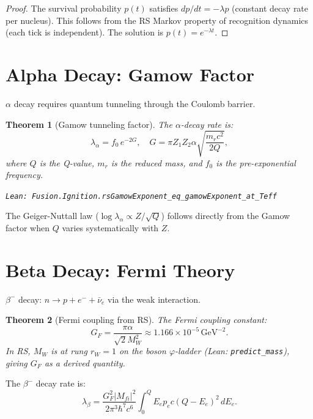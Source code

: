 \documentclass[12pt,a4paper]{article}
\newtheorem{theorem}{Theorem}[section]
\theoremstyle{definition}
\theoremstyle{remark}
\begin{document}
\begin{proof}
The survival probability $p(t)$ satisfies $dp/dt = -\lambda p$ (constant
decay rate per nucleus).  This follows from the RS Markov property of
recognition dynamics (each tick is independent).  The solution is
$p(t) = e^{-\lambda t}$.
\end{proof}

\section{Alpha Decay: Gamow Factor}

$\alpha$ decay requires quantum tunneling through the Coulomb barrier.

\begin{theorem}[Gamow tunneling factor]\label{thm:gamow}
The $\alpha$-decay rate is:
\begin{equation}
  \lambda_\alpha = f_0\,e^{-2G},\quad
  G = \pi Z_1 Z_2 \alpha\sqrt{\frac{m_r c^2}{2Q}},
\end{equation}
where $Q$ is the Q-value, $m_r$ is the reduced mass, and $f_0$ is the
pre-exponential frequency.

\texttt{Lean: Fusion.Ignition.rsGamowExponent\_eq\_gamowExponent\_at\_Teff}
\end{theorem}

The Geiger-Nuttall law ($\log\lambda_\alpha \propto Z/\sqrt{Q}$) follows
directly from the Gamow factor when $Q$ varies systematically with $Z$.

\section{Beta Decay: Fermi Theory}

$\beta^-$ decay: $n \to p + e^- + \bar{\nu}_e$ via the weak interaction.

\begin{theorem}[Fermi coupling from RS]\label{thm:fermi}
The Fermi coupling constant:
\begin{equation}
  G_F = \frac{\pi\alpha}{\sqrt{2}M_W^2}
  \approx 1.166 \times 10^{-5}\,\text{GeV}^{-2}.
\end{equation}
In RS, $M_W$ is at rung $r_W = 1$ on the boson $\varphi$-ladder
(Lean: \texttt{predict\_mass}), giving $G_F$ as a derived quantity.
\end{theorem}

The $\beta^-$ decay rate is:
\begin{equation}
  \lambda_\beta = \frac{G_F^2 |M_{fi}|^2}{2\pi^3\hbar^7 c^6}
  \int_0^{Q} E_e p_e c (Q - E_e)^2\,dE_e.
\end{equation}
\end{document}
